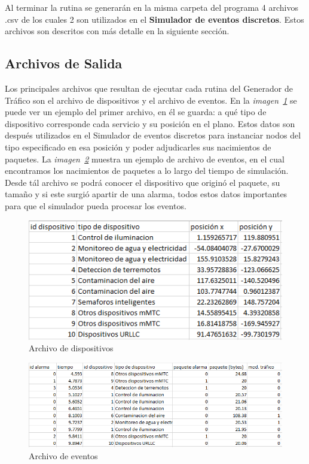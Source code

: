 Al terminar la rutina se generarán en la misma carpeta del programa 4 archivos .csv de los cuales 2 son utilizados en el \textbf{Simulador de eventos discretos}. Estos archivos son descritos con más detalle en la siguiente sección. \newline

\subsection{Archivos de Salida}

Los principales archivos que resultan de ejecutar cada rutina del Generador de Tráfico son el archivo de dispositivos y el archivo de eventos. En la \textit{imagen~\ref{fig:archivodispositivos}} se puede ver un ejemplo del primer archivo, en él se guarda: a qué tipo de dispositivo corresponde cada servicio y su posición en el plano. Estos datos son después utilizados en el Simulador de eventos discretos para instanciar nodos del tipo especificado en esa posición y poder adjudicarles sus nacimientos de paquetes. La \textit{imagen~\ref{fig:archivoeventos}} muestra un ejemplo de archivo de eventos, en el cual encontramos los nacimientos de paquetes a lo largo del tiempo de simulación. Desde tál archivo se podrá conocer el dispositivo que originó el paquete, su tamaño y si este surgió apartir de una alarma, todos estos datos importantes para que el simulador pueda procesar los eventos.  \newline

\begin{figure}[th]
    \centering
    \includegraphics[scale=.75]{Figures/disparchivo.png}
    \decoRule
    \caption[Archivo de dispositivos]{Archivo de dispositivos}
    \label{fig:archivodispositivos}
\end{figure}

\begin{figure}[th]
    \centering
    \includegraphics[scale=.75]{Figures/eventosarchivo.png}
    \decoRule
    \caption[Archivo de eventos]{Archivo de eventos}
    \label{fig:archivoeventos}
\end{figure}

